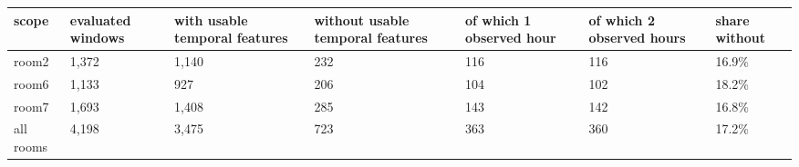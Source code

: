 \begin{tabular}{lllllll}
\hline
scope & evaluated windows & with usable temporal features & without usable temporal features & of which 1 observed hour & of which 2 observed hours & share without \\
\hline
room2 & 1,372 & 1,140 & 232 & 116 & 116 & 16.9\% \\
room6 & 1,133 & 927 & 206 & 104 & 102 & 18.2\% \\
room7 & 1,693 & 1,408 & 285 & 143 & 142 & 16.8\% \\
all rooms & 4,198 & 3,475 & 723 & 363 & 360 & 17.2\% \\
\hline
\end{tabular}
